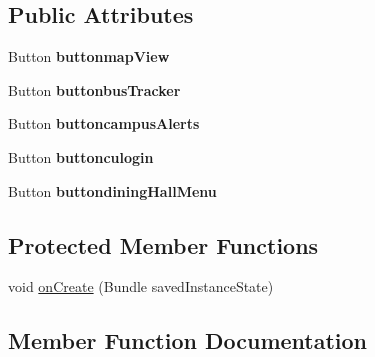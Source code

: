 \subsection*{Public Attributes}
\begin{DoxyCompactItemize}
\item 
\hypertarget{classcom_1_1bufflife_1_1bufflife_1_1_main_activity_ad63e0a8ab197f64591d22da45ce3e778}{}Button {\bfseries buttonmap\+View}\label{classcom_1_1bufflife_1_1bufflife_1_1_main_activity_ad63e0a8ab197f64591d22da45ce3e778}

\item 
\hypertarget{classcom_1_1bufflife_1_1bufflife_1_1_main_activity_a74e38f5103079101807345c98ba6b0db}{}Button {\bfseries buttonbus\+Tracker}\label{classcom_1_1bufflife_1_1bufflife_1_1_main_activity_a74e38f5103079101807345c98ba6b0db}

\item 
\hypertarget{classcom_1_1bufflife_1_1bufflife_1_1_main_activity_a038f64ee4f3113d798219aa8a305bb3f}{}Button {\bfseries buttoncampus\+Alerts}\label{classcom_1_1bufflife_1_1bufflife_1_1_main_activity_a038f64ee4f3113d798219aa8a305bb3f}

\item 
\hypertarget{classcom_1_1bufflife_1_1bufflife_1_1_main_activity_a495968a469e7ddbc41a004c4aae72a9f}{}Button {\bfseries buttonculogin}\label{classcom_1_1bufflife_1_1bufflife_1_1_main_activity_a495968a469e7ddbc41a004c4aae72a9f}

\item 
\hypertarget{classcom_1_1bufflife_1_1bufflife_1_1_main_activity_a6977b7ad5893e52140bea50c46d7dfbb}{}Button {\bfseries buttondining\+Hall\+Menu}\label{classcom_1_1bufflife_1_1bufflife_1_1_main_activity_a6977b7ad5893e52140bea50c46d7dfbb}

\end{DoxyCompactItemize}
\subsection*{Protected Member Functions}
\begin{DoxyCompactItemize}
\item 
void \hyperlink{classcom_1_1bufflife_1_1bufflife_1_1_main_activity_a287ff6c199dd2f0c8335cae6951b3c98}{on\+Create} (Bundle saved\+Instance\+State)
\end{DoxyCompactItemize}


\subsection{Member Function Documentation}
\hypertarget{classcom_1_1bufflife_1_1bufflife_1_1_main_activity_a287ff6c199dd2f0c8335cae6951b3c98}{}
